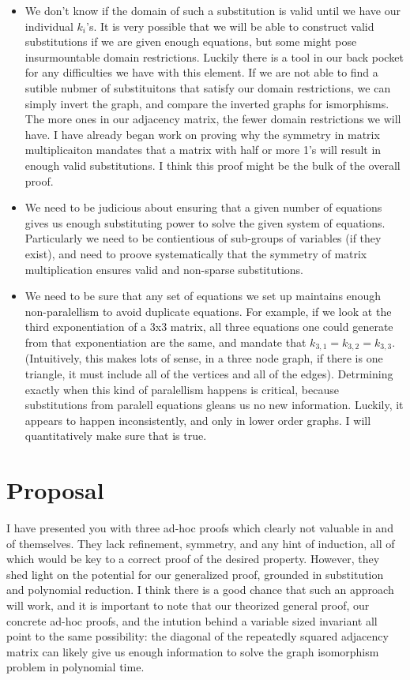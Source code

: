 \documentclass[a4paper,12pt]{article}
\begin{document}
\begin{itemize}
\item We don't know if the domain of such a substitution is valid until we have our individual \(k_i\)'s.  It is very possible that we will be able to construct valid substitutions if we are given enough equations, but some might pose insurmountable domain restrictions. Luckily
there is a tool in our back pocket for any difficulties we have with this element.  If we are not able to find a sutible nubmer of substituitons
that satisfy our domain restrictions, we can simply invert the graph, and compare the inverted graphs for ismorphisms.  The more ones in
our adjacency matrix, the fewer domain restrictions we will have.  I have already began work on proving why the symmetry in matrix
multiplicaiton mandates that a matrix with half or more 1's will result in enough valid substitutions.  I think this proof might be the bulk of
the overall proof.
\item We need to be judicious about ensuring that a given number of equations gives us enough substituting power to solve the given system of equations.  Particularly we need to be contientious of sub-groups of variables (if they exist), and need to proove systematically that the symmetry of matrix multiplication ensures valid and non-sparse substitutions.
\item We need to be sure that any set of equations we set up maintains enough non-paralellism to avoid duplicate equations.  For example, if we look at the third exponentiation of a 3x3 matrix, all three equations one could generate from that exponentiation are the same, and mandate that \(k_{3,1} = k_{3,2} = k_{3,3}\). (Intuitively, this makes lots of sense, in a three node graph, if there is one triangle, it must include all of the vertices and all of the edges). Detrmining exactly when this kind of paralellism happens is critical, because substitutions from paralell equations gleans us no new information. Luckily, it appears to happen inconsistently, and only in lower order graphs.  I will quantitatively make sure that is true.
\end{itemize}

\section*{Proposal}
I have presented you with three ad-hoc proofs which clearly not valuable in and of themselves. They lack refinement, symmetry, and any hint of induction,
all of which would be key to a correct proof of the desired property. However, they shed light on the potential for our generalized proof, grounded in substitution and polynomial reduction.  I think there is a good chance that such an approach will work, and it is important to note that our theorized general proof, our concrete ad-hoc proofs, and the intution behind a variable sized invariant all point to the same possibility: the diagonal of the repeatedly squared adjacency matrix can likely give us enough information to solve the graph isomorphism problem in polynomial time.
\end{document}
